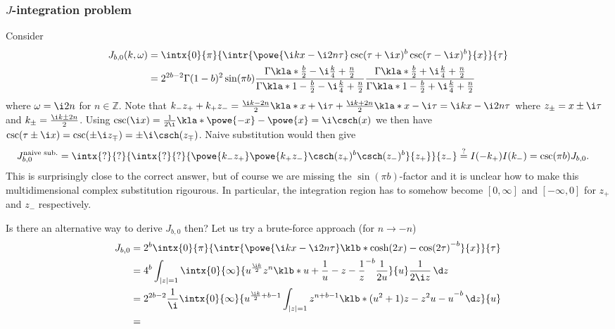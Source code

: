 \documentclass[english, parskip=full]{scrartcl}
\begin{document}
\subsubsection{$J$-integration problem}
Consider
\begin{align}
J_{b,0}(k,\omega) &= \intx{0}{\pi}{\intr{\powe{\i kx - \i 2n \tau} \csc(\tau + \i x)^b \csc(\tau - \i x)^b}{x} }{\tau} \\
&= 2^{2b-2} \Gamma(1-b)^2 \sin(\pi b) \frac{\Gamma\kla*{\frac{b}{2} - \i \frac{k}{4} + \frac{n}{2}}}{\Gamma\kla*{1 - \frac{b}{2} - \i \frac{k}{4} + \frac{n}{2}}} \frac{\Gamma\kla*{\frac{b}{2} + \i \frac{k}{4} + \frac{n}{2}}}{\Gamma\kla*{1 - \frac{b}{2} + \i \frac{k}{4} + \frac{n}{2}}}
\end{align}
where $\omega=\i 2n$ for $n\in\mathbb{Z}$.
Note that $k_-z_+ + k_+z_- = \frac{\i k- 2n}{2} \kla*{x +\i \tau} + \frac{\i k+ 2n}{2} \kla*{x -\i \tau} = \i kx - \i 2n\tau$ where $z_\pm = x \pm \i \tau$ and $k_\pm = \frac{\i k \pm 2n}{2}$.
Using $\csc(\i x) = \frac{1}{2\i} \kla*{\powe{-x} - \powe{x}} = \i \csch(x)$ we then have $\csc(\tau \pm \i x) = \csc(\pm \i z_\mp) = \pm \i \csch(z_\mp)$.
Naive substitution would then give
\begin{align}
J_{b,0}^\text{naive sub.} &= \intx{?}{?}{ \intx{?}{?}{ \powe{k_-z_+} \powe{k_+z_-} \csch(z_+)^b \csch(z_-)^b }{z_+}}{z_-} \overset{?}{=} I(-k_+) I(k_-) = \csc(\pi b) J_{b,0}.
\end{align}
This is surprisingly close to the correct answer, but of course we are missing the $\sin(\pi b)$-factor and it is unclear how to make this multidimensional complex substitution rigourous.
In particular, the integration region has to somehow become $[0,\infty]$ and $[-\infty, 0]$ for $z_+$ and $z_-$ respectively.

Is there an alternative way to derive $J_{b,0}$ then?
Let us try a brute-force approach (for $n\rightarrow-n$)
\begin{align}
J_{b,0} &= 2^b\intx{0}{\pi}{\intr{\powe{\i kx - \i 2n\tau} \klb*{\cosh(2x) - \cos(2\tau)}^{-b}}{x} }{\tau} \\
&= 4^b \int_{|z|=1}\intx{0}{\infty}{u^\frac{\i k}{2} z^n \klb*{u + \frac{1}{u} - z - \frac{1}{z}}^{-b} \frac{1}{2u} }{u} \frac{1}{2\i z} \,\d z\\
&= 2^{2b-2} \frac{1}{\i} \intx{0}{\infty}{ u^{\frac{\i k}{2} + b - 1} \int_{|z|=1} z^{n+b-1} \klb*{(u^2+1)z - z^2u - u}^{-b}\,\d z }{u}\\
&= 
\end{align}
\end{document}
